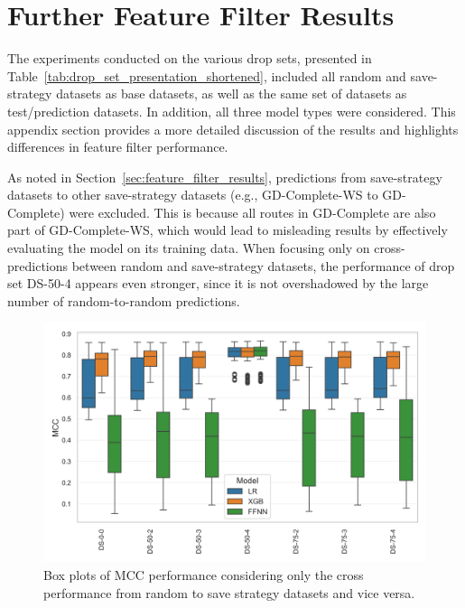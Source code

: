 \clearpage
\section{Further Feature Filter Results}
\label{app:sec:further_feature_filter}
The experiments conducted on the various drop sets, presented in Table~\ref{tab:drop_set_presentation_shortened}, included all
random and save-strategy datasets as base datasets, as well as the same set of datasets as test/prediction datasets.
In addition, all three model types were considered. This appendix section provides a more detailed discussion of the
results and highlights differences in feature filter performance.

As noted in Section~\ref{sec:feature_filter_results}, predictions from save-strategy datasets to other save-strategy datasets
(e.g., GD-Complete-WS to GD-Complete) were excluded. This is because all routes in GD-Complete are also part of GD-Complete-WS,
which would lead to misleading results by effectively evaluating the model on its training data. When focusing only on cross-predictions
between random and save-strategy datasets, the performance of drop set DS-50-4 appears even stronger, since it is not overshadowed by
the large number of random-to-random predictions.
\begin{figure}[ht]
    \centering
    \includegraphics[width = .85\textwidth]{pictures/feature_filter/cross_performance_boxplot.png}
    \caption{Box plots of MCC performance considering only the cross performance from random to save strategy datasets and vice versa.}
    \label{fig:mcc_filter_results_cross}
\end{figure}

